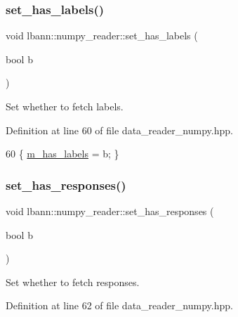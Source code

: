 \subsubsection{\texorpdfstring{set\+\_\+has\+\_\+labels()}{set\_has\_labels()}}
{\footnotesize\ttfamily void lbann\+::numpy\+\_\+reader\+::set\+\_\+has\+\_\+labels (\begin{DoxyParamCaption}\item[{bool}]{b }\end{DoxyParamCaption})\hspace{0.3cm}{\ttfamily [inline]}}



Set whether to fetch labels. 



Definition at line 60 of file data\+\_\+reader\+\_\+numpy.\+hpp.


\begin{DoxyCode}
60 \{ \hyperlink{classlbann_1_1numpy__reader_a0e8caa5609e706bf909b78c4c35377b8}{m\_has\_labels} = b; \}
\end{DoxyCode}
\mbox{\label{classlbann_1_1numpy__reader_a511981e78b175345b6b8a84b5f688774}} 
\subsubsection{\texorpdfstring{set\+\_\+has\+\_\+responses()}{set\_has\_responses()}}
{\footnotesize\ttfamily void lbann\+::numpy\+\_\+reader\+::set\+\_\+has\+\_\+responses (\begin{DoxyParamCaption}\item[{bool}]{b }\end{DoxyParamCaption})\hspace{0.3cm}{\ttfamily [inline]}}



Set whether to fetch responses. 



Definition at line 62 of file data\+\_\+reader\+\_\+numpy.\+hpp.


